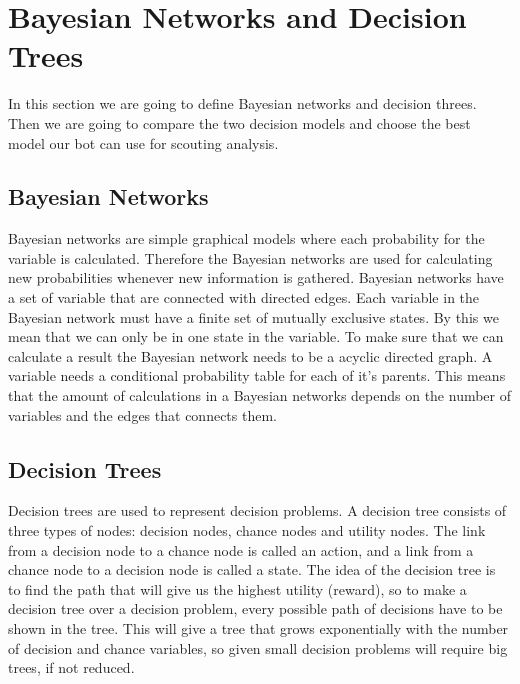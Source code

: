 \section{Bayesian Networks and Decision Trees}
In this section we are going to define Bayesian networks and decision threes. Then we are going to compare the two decision models and choose the best model our bot can use for scouting analysis.

\subsection{Bayesian Networks}
	Bayesian networks are simple graphical models where each probability for the variable is calculated. Therefore the Bayesian networks are used for calculating new probabilities whenever new information is gathered. Bayesian networks have a  set of variable that are connected with directed edges. Each variable in the Bayesian network must have a finite set of mutually exclusive states. By this we mean that we can only be in one state in the variable. To make sure that we can calculate a result the Bayesian network needs to be a acyclic directed graph. A variable needs a conditional probability table for each of it's parents. This means that the amount of calculations in a Bayesian networks depends on the number of variables and the edges that connects them.

\subsection{Decision Trees}
Decision trees are used to represent decision problems. A decision tree consists of three types of nodes: decision nodes, chance nodes and utility nodes. The link from a decision node to a chance node is called an action, and a link from a chance node to a decision node is called a state. The idea of the decision tree is to find the path that will give us the highest utility (reward), so to make a decision tree over a decision problem, every possible path of decisions have to be shown in the tree. This will give a tree that grows exponentially with the number of decision and chance variables, so given small decision problems will require big trees, if not reduced. 
		
